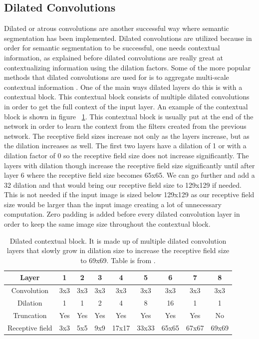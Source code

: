 \subsection{Dilated Convolutions}
Dilated or atrous convolutions are another successful way where semantic segmentation has been implemented. 
Dilated convolutions are utilized because in order for semantic segmentation to be successful, one needs contextual information, as explained before dilated convolutions are really great at contextualizing information using the dilation factors. 
Some of the more popular methods that dilated convolutions are used for is to aggregate multi-scale contextual information  \cite{Yu2016MultiScaleCA}. 
One of the main ways dilated layers do this is with a contextual block. 
This contextual block consists of multiple dilated convolutions in order to get the full context of the input layer. 
An example of the contextual block is shown in figure ~\ref{tab.dilated_context}.
This contextual block is usually put at the end of the network in order to learn the context from the filters created from the previous network. 
The receptive field sizes increase not only as the layers increase, but as the dilation increases as well.
The first two layers have a dilation of 1 or with a dilation factor of 0 so the receptive field size does not increase significantly. 
The layers with dilation though increase the receptive field size significantly until after layer 6 where the receptive field size becomes 65x65. 
We can go further and add a 32 dilation and that would bring our receptive field size to 129x129 if needed. 
This is not needed if the input image is sized below 129x129 as our receptive field size would be larger than the input image creating a lot of unnecessary computation. 
Zero padding is added before every dilated convolution layer in order to keep the same image size throughout the contextual block.

\begin{table}[tbh]
\renewcommand{\arraystretch}{0.7}
\centering
\begin{tabular}{|c |c|c|c|c|c|c|c|c|}
\hline
\textbf{Layer} & 1 & 2 & 3 & 4 & 5 & 6 & 7 & 8\\
\hline
\hline
Convolution & 3x3 & 3x3 & 3x3 & 3x3 & 3x3 & 3x3 & 3x3 & 3x3\\      
\hline
Dilation & 1 & 1 & 2 & 4 & 8 & 16 & 1 & 1\\
\hline
Truncation & Yes & Yes & Yes & Yes & Yes & Yes & Yes & No\\
\hline
Receptive field & 3x3 & 5x5 & 9x9 & 17x17 & 33x33 & 65x65 & 67x67 & 69x69\\
\hline
\end{tabular}
\caption{Dilated contextual block. It is made up of multiple dilated convolution layers that slowly grow in dilation size to increase the receptive field size to 69x69. Table is from \cite{Yu2016MultiScaleCA}.}
\label{tab.dilated_context}
\end{table}


